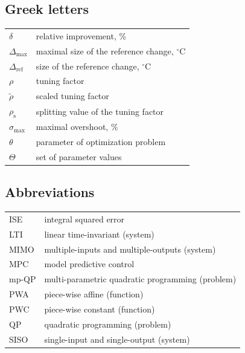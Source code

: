 \documentclass[preprint,12pt]{elsarticle}
\begin{document}
	\subsection{Greek letters}
		\begin{tabular}{ l l }
			$\delta$ & relative improvement, \% \\
			$\Delta_\mathrm{max}$ & maximal size of the reference change, $^{\circ}\mathrm{C}$  \\
			$\Delta_\mathrm{ref}$ & size of the reference change, $^{\circ}\mathrm{C}$ \\
			$\rho$ & tuning factor \\
			$\widetilde{\rho}$ & scaled tuning factor \\
			$\rho_{\mathrm{s}}$ & splitting value of the tuning factor \\
			$\sigma_{\max}$ & maximal overshoot, \% \\
			$\theta$ & parameter of optimization problem \\
			$\Theta$ & set of parameter values
		\end{tabular}
	
	\subsection*{Abbreviations}
		\begin{tabular}{ l l }
			ISE  & integral squared error \\
			LTI  & linear time-invariant (system) \\
			MIMO & multiple-inputs and multiple-outputs (system) \\
			MPC  & model predictive control \\
			mp-QP& multi-parametric quadratic programming (problem) \\
			PWA  & piece-wise affine (function) \\
			PWC  & piece-wise constant (function) \\
			QP   & quadratic programming (problem) \\
			SISO & single-input and single-output (system) \\
		\end{tabular}
	
	
\end{document}
